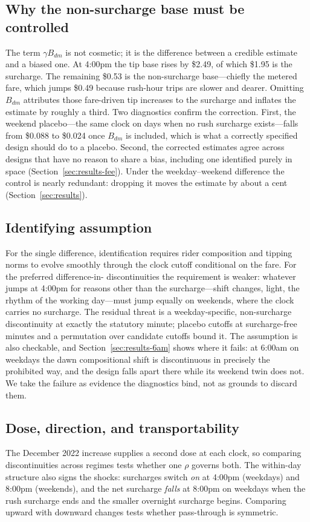 \subsection{Why the non-surcharge base must be controlled}
The term $\gamma B_{dm}$ is not cosmetic; it is the difference between a
credible estimate and a biased one. At 4:00pm the tip base rises by
\$2.49, of which \$1.95 is the surcharge. The remaining \$0.53 is the
non-surcharge base---chiefly the metered fare, which jumps \$0.49
because rush-hour trips are slower and dearer. Omitting $B_{dm}$
attributes those fare-driven tip increases to the surcharge and inflates
the estimate by roughly a third. Two diagnostics confirm the correction.
First, the weekend placebo---the same clock on days when no rush
surcharge exists---falls from \$0.088 to \$0.024 once $B_{dm}$ is
included, which is what a correctly specified design should do to a
placebo. Second, the corrected estimates
agree across designs that have no reason to share a bias, including one
identified purely in space (Section~\ref{sec:results-fee}). Under the
weekday--weekend difference the control is nearly redundant: dropping it
moves the estimate by about a cent (Section~\ref{sec:results}).

\subsection{Identifying assumption}
For the single difference, identification requires rider composition
and tipping norms to evolve smoothly through the clock cutoff
conditional on the fare. For the preferred difference-in-
discontinuities the requirement is weaker: whatever jumps at 4:00pm for
reasons other than the surcharge---shift changes, light, the rhythm of
the working day---must jump equally on weekends, where the clock
carries no surcharge. The residual threat is a weekday-specific,
non-surcharge discontinuity at exactly the statutory minute; placebo
cutoffs at surcharge-free minutes and a permutation over candidate
cutoffs bound it. The assumption is also checkable, and
Section~\ref{sec:results-6am} shows where it fails: at 6:00am on
weekdays the dawn compositional shift is discontinuous in precisely the
prohibited way, and the design falls apart there while its weekend twin
does not. We take the failure as evidence the diagnostics bind, not as
grounds to discard them.

\subsection{Dose, direction, and transportability}
The December 2022 increase supplies a second dose at each clock, so
comparing discontinuities across regimes tests whether one $\rho$
governs both. The within-day structure also signs the shocks: surcharges
switch \emph{on} at 4:00pm (weekdays) and 8:00pm (weekends), and the net
surcharge \emph{falls} at 8:00pm on weekdays when the rush surcharge
ends and the smaller overnight surcharge begins. Comparing upward with
downward changes tests whether pass-through is symmetric.

